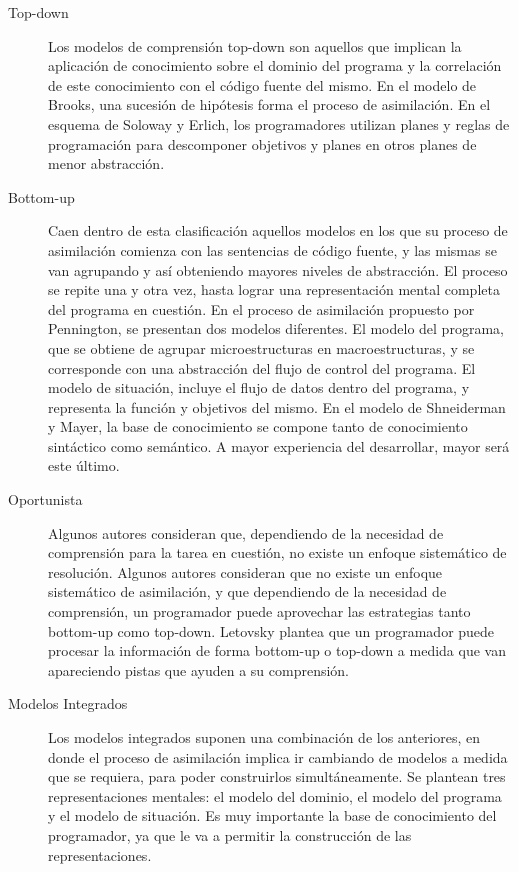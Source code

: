 \begin{description}
    \item[Top-down] Los modelos de comprensión top-down son aquellos que implican la
    aplicación de conocimiento sobre el dominio del programa y la correlación de este
    conocimiento con el código fuente del mismo.
    En el modelo de Brooks, una sucesión de hipótesis forma el proceso de asimilación.
    En el esquema de Soloway y Erlich, los programadores utilizan planes y reglas de programación
    para descomponer objetivos y planes en otros planes de menor abstracción.
     
    \item[Bottom-up] Caen dentro de esta clasificación aquellos modelos en
    los que su proceso de asimilación comienza con las sentencias de código fuente, y
    las mismas se van agrupando y así obteniendo mayores niveles de abstracción.
    El proceso se repite una y otra vez, hasta lograr una representación mental completa
    del programa en cuestión.
    En el proceso de asimilación propuesto por Pennington, se presentan dos modelos diferentes.
    El modelo del programa, que se obtiene de agrupar microestructuras en macroestructuras, y
    se corresponde con una abstracción del flujo de control del programa.
    El modelo de situación, incluye el flujo de datos dentro del programa, y representa la
    función y objetivos del mismo.
    En el modelo de Shneiderman y Mayer, la base de conocimiento se compone tanto de
    conocimiento sintáctico como semántico.
    A mayor experiencia del desarrollar, mayor será este último.

    \item[Oportunista] Algunos autores consideran que, dependiendo
    de la necesidad de comprensión para la tarea en cuestión, no existe un enfoque
    sistemático de resolución.
    Algunos autores consideran que no existe un enfoque sistemático de asimilación,
    y que dependiendo de la necesidad de comprensión, un programador puede aprovechar
    las estrategias tanto bottom-up como top-down.
    Letovsky plantea que un programador puede procesar la información de forma bottom-up
    o top-down a medida que van apareciendo pistas que ayuden a su comprensión.
    
    \item[Modelos Integrados] Los modelos integrados suponen una combinación de los
    anteriores, en donde el proceso de asimilación implica ir cambiando de
    modelos a medida que se requiera, para poder construirlos simultáneamente.
    Se plantean tres representaciones mentales: el modelo del dominio, el modelo del
    programa y el modelo de situación.
    Es muy importante la base de conocimiento del programador, ya que le va a permitir
    la construcción de las representaciones.

\end{description}
